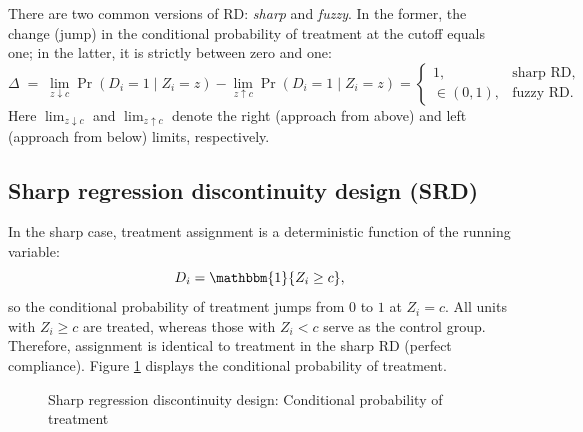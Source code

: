 There are two common versions of RD: \emph{sharp} and \emph{fuzzy}. In the former, the change (jump) in the conditional probability of treatment at the cutoff equals one; in the latter, it is strictly between zero and one:
\[
\Delta \;=\; \lim_{z \downarrow c}\Pr(D_i=1\mid Z_i=z)-\lim_{z \uparrow c}\Pr(D_i=1\mid Z_i=z)
=
\begin{cases}
	1, & \text{sharp RD},\\[2pt]
	\in(0,1), & \text{fuzzy RD}.
\end{cases}
\]
Here $\lim_{z \downarrow c}$ and $\lim_{z \uparrow c}$ denote the right (approach from above) and left (approach from below) limits, respectively.

\subsection{Sharp regression discontinuity design (SRD)}

In the sharp case, treatment assignment is a deterministic function of the running variable:
\[
D_i = \mathbbm{1}\{Z_i \ge c\},
\]
so the conditional probability of treatment jumps from $0$ to $1$ at $Z_i=c$. All units with $Z_i \ge c$ are treated, whereas those with $Z_i < c$ serve as the control group. Therefore, assignment is identical to treatment in the sharp RD (perfect compliance). Figure \ref{Fig:SRDD} displays the conditional probability of treatment. 

\begin{figure}[ht]
	\centering
\caption{Sharp regression discontinuity design: Conditional probability of treatment}
\label{Fig:SRDD}
\end{figure}

